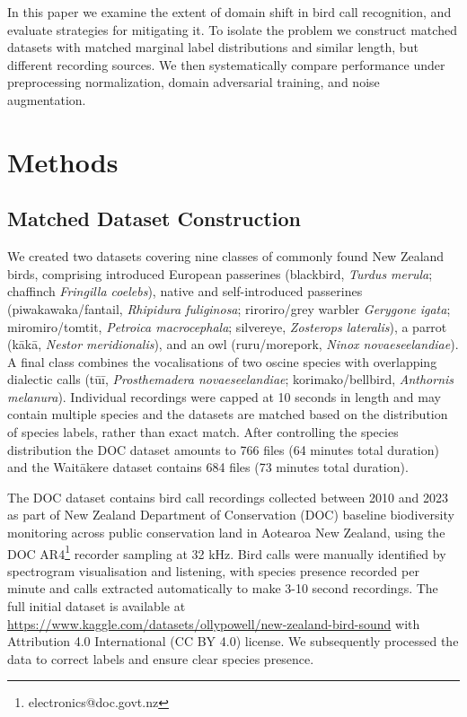 \documentclass[peer-review]{fa2026}
\begin{document}
In this paper we examine the extent of domain shift in bird call recognition, and evaluate strategies for mitigating it. To isolate the problem we construct matched datasets with matched marginal label distributions and similar length, but different recording sources. We then systematically compare performance under preprocessing normalization, domain adversarial training, and noise augmentation.

\section{Methods}

\subsection{Matched Dataset Construction}

We created two datasets covering nine classes of commonly found New Zealand birds, comprising introduced European passerines (blackbird, \textit{Turdus merula}; chaffinch \textit{Fringilla coelebs}), native and self-introduced passerines (piwakawaka/fantail, \textit{Rhipidura fuliginosa}; riroriro/grey warbler \textit{Gerygone igata}; miromiro/tomtit, \textit{Petroica macrocephala}; silvereye, \textit{Zosterops lateralis}), a parrot (k\=ak\=a, \textit{Nestor meridionalis}), and an owl (ruru/morepork, \textit{Ninox novaeseelandiae}). A final class combines the vocalisations of two oscine species with overlapping dialectic calls (t\=u\=i, \textit{Prosthemadera novaeseelandiae}; korimako/bellbird, \textit{Anthornis melanura}). Individual recordings were capped at 10 seconds in length and may contain multiple species and the datasets are matched based on the distribution of species labels, rather than exact match. After controlling the species distribution the DOC dataset amounts to 766 files (64 minutes total duration) and the Wait\=akere dataset contains 684 files (73 minutes total duration). 

The DOC dataset contains bird call recordings collected between 2010 and 2023 as part of New Zealand Department of Conservation (DOC) baseline biodiversity monitoring across public conservation land in Aotearoa New Zealand, using the DOC AR4\footnote{electronics@doc.govt.nz} recorder sampling at 32 kHz. Bird calls were manually identified by spectrogram visualisation and listening, with species presence recorded per minute and calls extracted automatically to make 3-10 second recordings. The full initial dataset is available at \url{https://www.kaggle.com/datasets/ollypowell/new-zealand-bird-sound} with Attribution 4.0 International (CC BY 4.0) license. We subsequently processed the data to correct labels and ensure clear species presence. 
\end{document}
